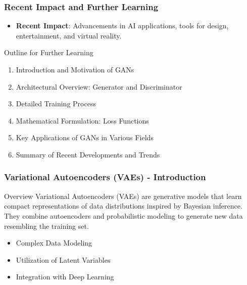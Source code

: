 \documentclass[aspectratio=169]{beamer}
\begin{document}
\begin{frame}[fragile]
    \frametitle{Recent Impact and Further Learning}
    \begin{itemize}
        \item \textbf{Recent Impact}: Advancements in AI applications, tools for design, entertainment, and virtual reality.
    \end{itemize}

    \begin{block}{Outline for Further Learning}
        \begin{enumerate}
            \item Introduction and Motivation of GANs
            \item Architectural Overview: Generator and Discriminator
            \item Detailed Training Process
            \item Mathematical Formulation: Loss Functions
            \item Key Applications of GANs in Various Fields
            \item Summary of Recent Developments and Trends
        \end{enumerate}
    \end{block}
\end{frame}

\begin{frame}[fragile]
    \frametitle{Variational Autoencoders (VAEs) - Introduction}
    \begin{block}{Overview}
        Variational Autoencoders (VAEs) are generative models that learn compact representations of data distributions inspired by Bayesian inference.
        They combine autoencoders and probabilistic modeling to generate new data resembling the training set.
    \end{block}
    
    \begin{itemize}
        \item Complex Data Modeling
        \item Utilization of Latent Variables
        \item Integration with Deep Learning
    \end{itemize}
\end{frame}
\end{document}
